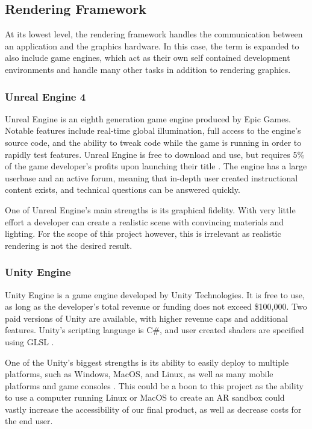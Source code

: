 \subsection{Rendering Framework}
At its lowest level, the rendering framework handles the communication between an application and the graphics hardware. In this case, the term is expanded to also include game engines, which act as their own self contained development environments and handle many other tasks in addition to rendering graphics.

\subsubsection{Unreal Engine 4}
Unreal Engine is an eighth generation game engine produced by Epic Games. Notable features include real-time global illumination, full access to the engine's source code, and the ability to tweak code while the game is running in order to rapidly test features.
Unreal Engine is free to download and use, but requires 5\% of the game developer's profits upon launching their title .
The engine has a large userbase and an active forum, meaning that in-depth user created instructional content exists, and technical questions can be answered quickly. 

One of Unreal Engine's main strengths is its graphical fidelity. 
With very little effort a developer can create a realistic scene with convincing materials and lighting.
For the scope of this project however, this is irrelevant as realistic rendering is not the desired result.

\subsubsection{Unity Engine}
Unity Engine is a game engine developed by Unity Technologies. It is free to use, as long as the developer's total revenue or funding does not exceed \$100,000. Two paid versions of Unity are available, with higher revenue caps and additional features. 
Unity's scripting language is C\#, and user created shaders are specified using GLSL .

One of the Unity's biggest strengths is its ability to easily deploy to multiple platforms, such as Windows, MacOS, and Linux, as well as many mobile platforms and game consoles . 
This could be a boon to this project as the ability to use a computer running Linux or MacOS to create an AR sandbox could vastly increase the accessibility of our final product, as well as decrease costs for the end user.

